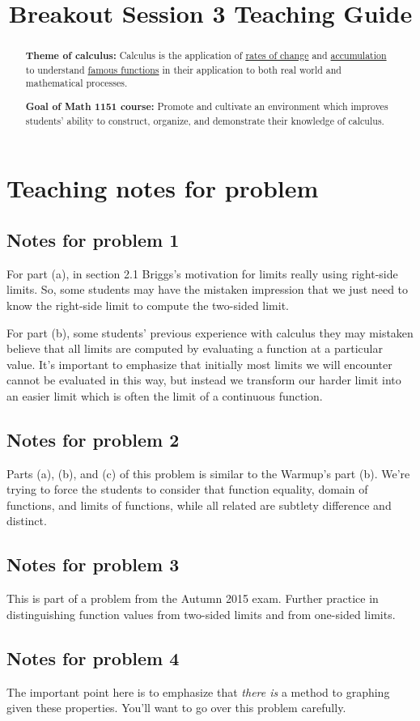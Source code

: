 \documentclass[nooutcomes]{ximera}
\title{Breakout Session 3 Teaching Guide}
\begin{document}
\begin{abstract}
 \textbf{Theme of calculus:} Calculus is the application of  \href{https://en.wikipedia.org/wiki/Derivative}{rates of change} and \href{https://en.wikipedia.org/wiki/Integral}{accumulation} to understand \href{https://en.wikipedia.org/wiki/Elementary_function}{famous functions} in their application to both real world and mathematical processes.

  \textbf{Goal of Math 1151 course:} Promote and cultivate an environment which improves students' ability to construct, organize, and demonstrate their knowledge of calculus.
\end{abstract}
\maketitle

\section{Teaching notes for problem}
\subsection*{Notes for problem 1}
For part (a), in section 2.1 Briggs's motivation for limits really using right-side limits.
So, some students may have the mistaken impression that we just need to know the right-side limit to compute the two-sided limit.

For part (b), some students' previous experience with calculus they may mistaken believe that all limits are computed by evaluating a function at a particular value.
It's important to emphasize that initially most limits we will encounter cannot be evaluated in this way, but instead we transform our harder limit into an easier limit which is often the limit of a continuous function.

\subsection*{Notes for problem 2}
Parts (a), (b), and (c) of this problem is similar to the Warmup's part (b).
We're trying to force the students to consider that function equality, domain of functions, and limits of functions, while all related are subtlety difference and distinct.

\subsection*{Notes for problem 3}
This is part of a problem from the Autumn 2015 exam. 
Further practice in distinguishing function values from two-sided limits and from one-sided limits.

\subsection*{Notes for problem 4}
The important point here is to emphasize that \emph{there is} a method to graphing given these properties.
You'll want to go over this problem carefully.
\end{document}

